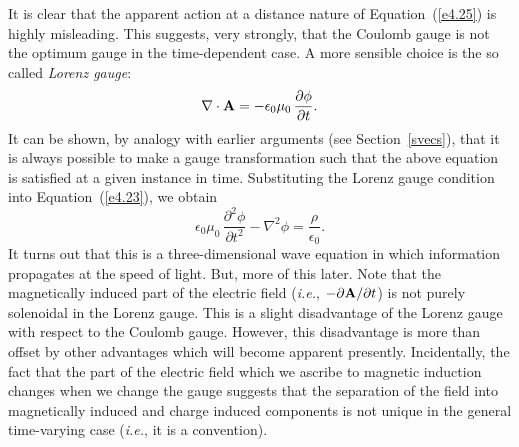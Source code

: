 It is clear that the apparent action at a distance
nature of Equation~(\ref{e4.25}) is highly misleading. This suggests, very strongly, that the
Coulomb gauge is not the optimum gauge in the time-dependent case. A more
sensible choice is the so called {\em Lorenz gauge}:
\begin{equation}\label{e4.26}
\nabla\cdot {\bf A} = -\epsilon_0 \mu_0 \,\frac{\partial \phi}{\partial t}.
\end{equation}
It can be shown, by analogy with earlier arguments (see Section~\ref{svecs}), that
it
is always possible to make a gauge transformation 
such that the above equation is satisfied at a given instance in time. Substituting the Lorenz gauge condition
into Equation~(\ref{e4.23}), we obtain
\begin{equation}
\epsilon_0\mu_0\,\frac{\partial^2\phi}{\partial t^2} - \nabla^2\phi = \frac{\rho}
{\epsilon_0}.
\end{equation}
It turns out that this is a three-dimensional wave equation in which information
propagates at the speed of light. But, more of this later. 
Note that the magnetically induced part of
the electric field ({\em i.e.}, $-\partial {\bf A}/\partial t$) 
is not purely solenoidal in the Lorenz
gauge. This is a slight disadvantage of the Lorenz gauge with respect to the
Coulomb gauge. However, this disadvantage
is more than offset by other advantages which will
become apparent presently. Incidentally, the fact that the part of the electric
field which we
ascribe to magnetic induction changes when we change the gauge suggests
 that the separation
of the field into magnetically induced and charge induced components is not
unique in the general time-varying case ({\em i.e.}, it is a convention). 

